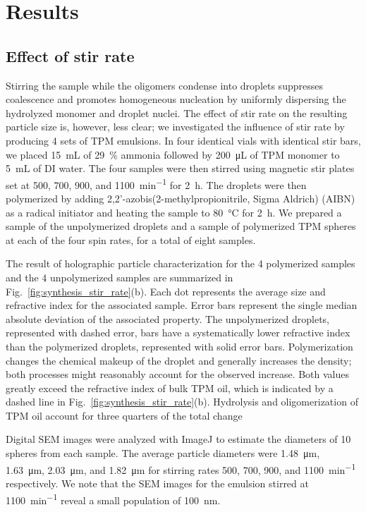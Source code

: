 \section{Results}
\subsection{Effect of stir rate}

Stirring the sample while the oligomers condense into droplets suppresses coalescence and
promotes homogeneous nucleation by uniformly dispersing the hydrolyzed monomer and droplet
nuclei. %
The effect of stir rate on the resulting particle size is, however, less clear;
we investigated the influence of stir rate by producing \num{4} sets of TPM emulsions.
In four identical vials with identical stir bars, we placed \SI{15}{\milli\liter} of 
\SI{29}{\percent} ammonia followed by \SI{200}{\micro\liter} of TPM 
monomer to \SI{5}{\milli\liter} of DI water. The four samples were then stirred 
using magnetic stir plates set at \num{500}, \num{700}, \num{900}, and
\SI{1100}{\minute^{-1}} for \SI{2}{\hour}. %
The droplets were then polymerized by adding
\num{2},\num{2}'-azobis(\num{2}-methylpropionitrile, Sigma Aldrich) (AIBN) as a radical initiator and %
heating the sample to \SI{80}{\celsius} for \SI{2}{\hour}.
We prepared a sample of the unpolymerized droplets and a sample of polymerized TPM spheres
at each of the four spin rates, for a total of eight samples.

The result of holographic particle characterization for the \num{4} polymerized samples
and the \num{4} unpolymerized samples are summarized in Fig.~\ref{fig:synthesis_stir_rate}(b).
Each dot represents the average size and refractive index for the associated sample. Error
bars represent the single median absolute deviation of the associated property.
The unpolymerized droplets, represented with dashed error, bars have a systematically
lower refractive index than the polymerized droplets, represented with solid error bars.
Polymerization changes the chemical makeup of the droplet and generally increases the
density; both processes might reasonably account for the observed increase.
Both values greatly exceed the refractive index of bulk TPM oil, which is indicated by
a dashed line in Fig.~\ref{fig:synthesis_stir_rate}(b).
Hydrolysis and oligomerization of TPM oil account for three quarters of
the total change 

Digital SEM images were analyzed with ImageJ to estimate the diameters of \num{10}
spheres from each sample.
The average particle diameters were \SI{1.48}{\um}, \SI{1.63}{\um},
\SI{2.03}{\um}, and \SI{1.82}{\um} for stirring rates \num{500}, \num{700}, \num{900}, and
\SI{1100}{\minute^{-1}} respectively. We note that the SEM images for the emulsion
stirred at \SI{1100}{\minute^{-1}} reveal a small population of \SI{100}{\nm}.


